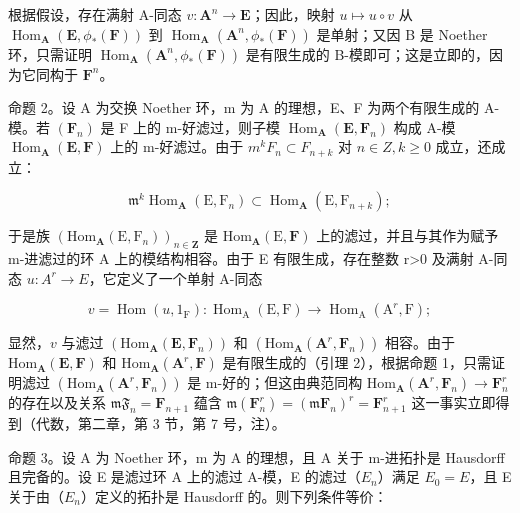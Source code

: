 根据假设，存在满射 A-同态 \(v: \mathbf{A}^n \to \mathbf{E}\)；因此，映射 \(u \mapsto u \circ v\) 从 \(\operatorname{Hom}_{\mathbf{A}}(\mathbf{E}, \phi_*(\mathbf{F}))\) 到 \(\operatorname{Hom}_{\mathbf{A}}(\mathbf{A}^n, \phi_*(\mathbf{F}))\) 是单射；又因 B 是 Noether 环，只需证明 \(\operatorname{Hom}_{\mathbf{A}}(\mathbf{A}^n, \phi_*(\mathbf{F}))\) 是有限生成的 B-模即可；这是立即的，因为它同构于 \(\mathbf{F}^n\)。

命题 2。设 A 为交换 Noether 环，m 为 A 的理想，E、F 为两个有限生成的 A-模。若 \((\mathbf{F}_{n})\) 是 F 上的 m-好滤过，则子模 \(\operatorname{Hom}_{\mathbf{A}}(\mathbf{E}, \mathbf{F}_{n})\) 构成 A-模 \(\operatorname{Hom}_{\mathbf{A}}(\mathbf{E}, \mathbf{F})\) 上的 m-好滤过。由于 \(m^{k}F_{n}\subset F_{n+k}\) 对 \(n\in Z, k\geqslant0\) 成立，还成立：

\[
\mathfrak {m} ^ {k} \operatorname{Hom} _ {\mathbf {A}} (\mathrm{E}, \mathrm{F} _ {n}) \subset \operatorname{Hom} _ {\mathbf {A}} (\mathrm{E}, \mathrm{F} _ {n + k});
\]

于是族 \((\mathrm{Hom}_{\mathbf{A}}(\mathrm{E},\mathrm{F}_{n}))_{n\in\mathbf{Z}}\) 是 \(\mathrm{Hom}_{\mathbf{A}}(\mathrm{E},\mathbf{F})\) 上的滤过，并且与其作为赋予 m-进滤过的环 A 上的模结构相容。由于 E 有限生成，存在整数 r\textgreater0 及满射 A-同态 \(u:A^{r}\rightarrow E\)，它定义了一个单射 A-同态

\[
v = \operatorname{Hom} (u, 1 _ {\mathrm{F}}): \operatorname{Hom} _ {\mathrm{A}} (\mathrm{E}, \mathrm{F}) \rightarrow \operatorname{Hom} _ {\mathrm{A}} (\mathrm{A} ^ {r}, \mathrm{F});
\]

显然，\(v\) 与滤过 \((\mathrm{Hom}_{\mathbf{A}}(\mathbf{E},\mathbf{F}_n))\) 和 \((\mathrm{Hom}_{\mathbf{A}}(\mathbf{A}^r,\mathbf{F}_n))\) 相容。由于 \(\mathrm{Hom}_{\mathbf{A}}(\mathbf{E},\mathbf{F})\) 和 \(\mathrm{Hom}_{\mathbf{A}}(\mathbf{A}^r,\mathbf{F})\) 是有限生成的（引理 2），根据命题 1，只需证明滤过 \((\mathrm{Hom}_{\mathbf{A}}(\mathbf{A}^{r},\mathbf{F}_{n}))\) 是 m-好的；但这由典范同构 \(\mathrm{Hom}_{\mathbf{A}}(\mathbf{A}^{r},\mathbf{F}_{n})\to \mathbf{F}_{n}^{r}\) 的存在以及关系 \(\mathfrak{mF}_n = \mathbf{F}_{n + 1}\) 蕴含 \(\mathfrak{m}(\mathbf{F}_n^r) = (\mathfrak{m}\mathbf{F}_n)^r = \mathbf{F}_{n + 1}^r\) 这一事实立即得到（代数，第二章，第 3 节，第 7 号，注）。

命题 3。设 A 为 Noether 环，m 为 A 的理想，且 A 关于 m-进拓扑是 Hausdorff 且完备的。设 E 是滤过环 A 上的滤过 A-模，E 的滤过（\(E_{n}\)）满足 \(E_{0} = E\)，且 E 关于由（\(E_{n}\)）定义的拓扑是 Hausdorff 的。则下列条件等价：

